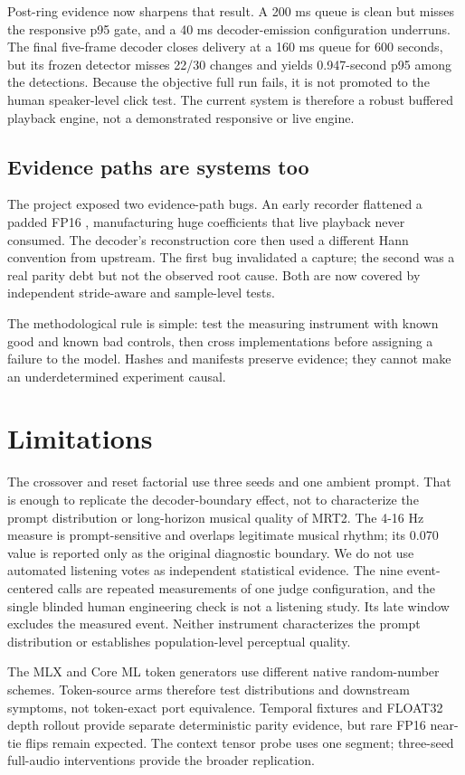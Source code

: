 \documentclass[10pt]{article}
\begin{document}
Post-ring evidence now sharpens that result. A 200 ms queue is clean but misses the responsive p95 gate, and a 40 ms decoder-emission configuration underruns. The final five-frame decoder closes delivery at a 160 ms queue for 600 seconds, but its frozen detector misses 22/30 changes and yields 0.947-second p95 among the detections. Because the objective full run fails, it is not promoted to the human speaker-level click test. The current system is therefore a robust buffered playback engine, not a demonstrated responsive or live engine.

\subsection{Evidence paths are systems too}
The project exposed two evidence-path bugs. An early recorder flattened a padded FP16 \texttt{}, manufacturing huge coefficients that live playback never consumed. The decoder's reconstruction core then used a different Hann convention from upstream. The first bug invalidated a capture; the second was a real parity debt but not the observed root cause. Both are now covered by independent stride-aware and sample-level tests.

The methodological rule is simple: test the measuring instrument with known good and known bad controls, then cross implementations before assigning a failure to the model. Hashes and manifests preserve evidence; they cannot make an underdetermined experiment causal.

\section{Limitations}
The crossover and reset factorial use three seeds and one ambient prompt. That is enough to replicate the decoder-boundary effect, not to characterize the prompt distribution or long-horizon musical quality of MRT2. The 4-16 Hz measure is prompt-sensitive and overlaps legitimate musical rhythm; its 0.070 value is reported only as the original diagnostic boundary. We do not use automated listening votes as independent statistical evidence. The nine event-centered calls are repeated measurements of one judge configuration, and the single blinded human engineering check is not a listening study. Its late window excludes the measured event. Neither instrument characterizes the prompt distribution or establishes population-level perceptual quality.

The MLX and Core ML token generators use different native random-number schemes. Token-source arms therefore test distributions and downstream symptoms, not token-exact port equivalence. Temporal fixtures and FLOAT32 depth rollout provide separate deterministic parity evidence, but rare FP16 near-tie flips remain expected. The context tensor probe uses one segment; three-seed full-audio interventions provide the broader replication.
\end{document}

